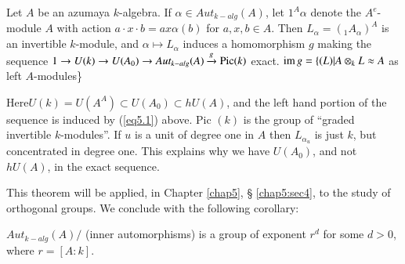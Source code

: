 \setcounter{theorem}{1}
\begin{theorem}\label{chap4:thm5.2}%
Let $A$ be an azumaya $k$-algebra. If $\alpha \in
Aut_{k-alg}(A)$, let $1^A\alpha$ denote the $A^e$-module $A$ with
action $a \cdot x \cdot b= ax \alpha (b)$ for $a,x,b \in A$. Then $L_\alpha =
(_{1}A_\alpha)^A$ is an invertible $k$-module, and $\alpha \mapsto
L_\alpha$ induces a homomorphism $g$ making the sequence $1 \to U(k)
\to U(A_0) \to Aut_{k-alg}(A) \xrightarrow {g} \operatorname{Pic} (k)$		 
exact. $\operatorname{im}  g = \{(L) | A \otimes_k L \approx A$ as left $A$-modules\}
\end{theorem}

Here\pageoriginale $U(k) = U(A^A) \subset U(A_0) \subset hU(A)$, and
the left hand 
portion of the sequence is induced by (\ref{eq5.1}) above. Pic $(k)$ is the
group of  ``graded invertible $k$-modules''. If $u$ is a unit of
degree one in $A$ then $L_{\alpha_u}$ is just $k$, but concentrated in
degree one. This explains why we have $U(A_0)$, and not $hU(A)$, in
the exact sequence.  

This theorem will be applied, in Chapter \ref{chap5}, \S
\ref{chap5:sec4}, to the study of 
orthogonal groups. We conclude with the following corollary:   

\setcounter{coro}{2}
\begin{coro}%
 $Aut_{k-alg}(A)/$ (inner automorphisms) is a group of exponent $r^d$
  for some $d>0$, where $r=[A:k]$. 
\end{coro}


